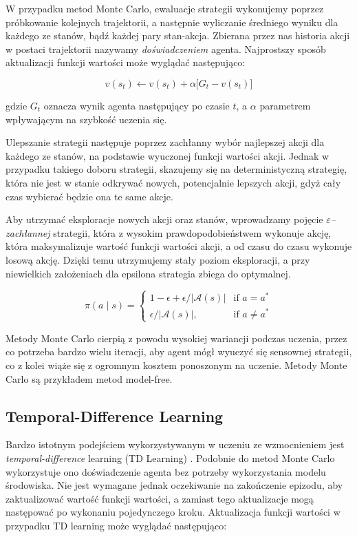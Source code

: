 \documentclass[licencjacka]{pracamgr}
\begin{document}
W przypadku metod Monte Carlo, ewaluacje strategii wykonujemy poprzez próbkowanie kolejnych trajektorii, a następnie wyliczanie średniego wyniku dla każdego ze stanów, bądź każdej pary stan-akcja. Zbierana przez nas historia akcji w postaci trajektorii nazywamy \emph{doświadczeniem} agenta. Najprostszy sposób aktualizacji funkcji wartości może wyglądać następująco:

$$ v(s_t) \leftarrow v(s_t) + \alpha \big[G_t - v(s_t)\big] $$

gdzie $G_t$ oznacza wynik agenta następujący po czasie $t$, a $\alpha$ parametrem wpływającym na szybkość uczenia się.

Ulepszanie strategii następuje poprzez zachłanny wybór najlepszej akcji dla każdego ze stanów, na podstawie wyuczonej funkcji wartości akcji. Jednak w przypadku takiego doboru strategii, skazujemy się na deterministyczną strategię, która nie jest w stanie odkrywać nowych, potencjalnie lepszych akcji, gdyż cały czas wybierać będzie ona te same akcje. 

Aby utrzymać eksploracje nowych akcji oraz stanów, wprowadzamy pojęcie \emph{$\varepsilon$--zachłannej} strategii, która z wysokim prawdopodobieństwem wykonuje akcję, która maksymalizuje wartość funkcji wartości akcji, a od czasu do czasu wykonuje losową akcję. Dzięki temu utrzymujemy stały poziom eksploracji, a przy niewielkich założeniach dla epsilona strategia zbiega do optymalnej.

$$
\pi(a \mid s) =
\begin{cases}
    1 - \epsilon + \epsilon/\lvert \mathcal{A}(s) \rvert & \text{if } a = a^\ast \\
    \epsilon/\lvert \mathcal{A}(s) \rvert,              & \text{if } a\neq a^\ast
\end{cases}
$$

Metody Monte Carlo cierpią z powodu wysokiej wariancji podczas uczenia, przez co potrzeba bardzo wielu iteracji, aby agent mógł wyuczyć się sensownej strategii, co z kolei wiąże się z ogromnym kosztem ponoszonym na uczenie. Metody Monte Carlo są przykładem metod model-free.

\subsection{Temporal-Difference Learning} 

Bardzo istotnym podejściem wykorzystywanym w uczeniu ze wzmocnieniem jest \emph{temporal-difference} learning (TD Learning) \cite{TD}. Podobnie do metod Monte Carlo wykorzystuje ono doświadczenie agenta bez potrzeby wykorzystania modelu środowiska. Nie jest wymagane jednak oczekiwanie na zakończenie epizodu, aby zaktualizować wartość funkcji wartości, a zamiast tego aktualizacje mogą następować po wykonaniu pojedynczego kroku. Aktualizacja funkcji wartości w przypadku TD learning może wyglądać następująco:
\end{document}
